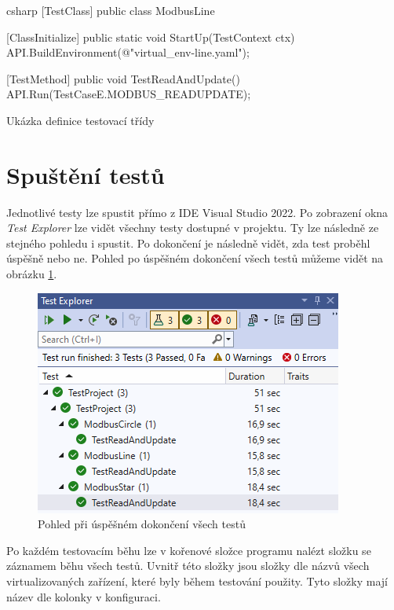 \begin{listing}[htbp]
    \centering
    \begin{cminted}[breaklines,autogobble, fontsize=\footnotesize]{csharp}
[TestClass]
public class ModbusLine
{
    [ClassInitialize]
    public static void StartUp(TestContext ctx)
    {
        API.BuildEnvironment(@"virtual_env\modbus\topologies\modbus-line.yaml");
    }

    [TestMethod]
    public void TestReadAndUpdate()
    {
        API.Run(TestCaseE.MODBUS_READUPDATE);
    }
}
    \end{cminted}
\caption{Ukázka definice testovací třídy}
\label{listing:test_class}
\end{listing}


\section{Spuštění testů}

Jednotlivé testy lze spustit přímo z IDE Visual Studio 2022. Po zobrazení okna \textit{Test Explorer} lze vidět všechny testy dostupné v projektu. Ty lze následně ze stejného pohledu i spustit. Po dokončení je následně vidět, zda test proběhl úspěšně nebo ne. Pohled po úspěšném dokončení všech testů můžeme vidět na obrázku \ref{fig:modbus_test_success}. 

\begin{figure}[htbp]
    \centering 
    \includegraphics{assets/img/modbus_test.png}
    \caption{Pohled při úspěšném dokončení všech testů}
    \label{fig:modbus_test_success}
\end{figure}

Po každém testovacím běhu lze v kořenové složce programu nalézt složku se záznamem běhu všech testů. Uvnitř této složky jsou složky dle názvů všech virtualizovaných zařízení, které byly během testování použity. Tyto složky mají název dle kolonky  v konfiguraci. 

